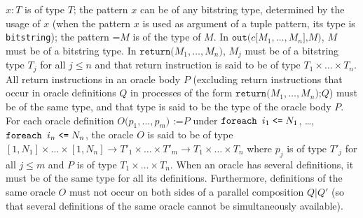 $x:T$ is of type $T$; the pattern $x$ can be of any bitstring type,
determined by the usage of $x$ (when the pattern $x$ is used as
argument of a tuple pattern, its type is \texttt{bitstring}); the
pattern $\texttt{=}M$ is of the type of $M$.
\ifchannels
In $\texttt{out(}c\texttt{[}M_1, \ldots, M_n\texttt{],}M\texttt{)}$,
$M$ must be of a bitstring type.
\else
In $\texttt{return(}M_1, \ldots, M_n\texttt{)}$,
$M_j$ must be of a bitstring type $T_j$ for all $j \leq n$
and that return instruction is said to be of type $T_1 \times \ldots 
\times T_n$.
All return instructions in an oracle body $P$ (excluding return
instructions that occur in oracle definitions $Q$ in processes of the form 
$\texttt{return(}M_1, \ldots, M_n\texttt{);}Q$) must be of the same
type, and that type is said to be the type of the oracle body $P$.
%
For each oracle definition $O\texttt{(}p_1, \ldots, p_m\texttt{) :=
}P$ under $\texttt{foreach }i_1\mathrel{\texttt{<=}} N_1$, \ldots,
$\texttt{foreach }i_n\mathrel{\texttt{<=}} N_n$, the oracle $O$ is said to be of
type $[1, N_1] \times \ldots \times [1, N_n] \rightarrow T'_1 \times
\ldots \times T'_m \rightarrow T_1 \times \ldots \times T_n$ where
$p_j$ is of type $T'_j$ for all $j \leq m$ and $P$ is of type $T_1
\times \ldots \times T_n$. When an oracle has several definitions,
it must be of the same type for all its definitions. Furthermore,
definitions of the same oracle $O$ must not occur on both sides
of a parallel composition $Q \texttt{|} Q'$ (so that several definitions
of the same oracle cannot be simultaneously available).
\fi


